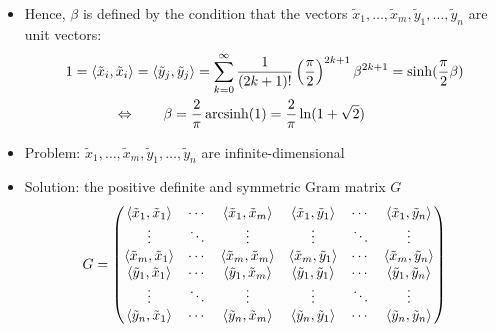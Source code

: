 	\begin{frame}
		\begin{pbmr}
			\begin{itemize}
				\item<1-> Hence, $\beta$ is defined by the condition that the vectors $\tilde{x}_1,\dots,\tilde{x}_m,\tilde{y}_1,\dots,\tilde{y}_n$ are unit vectors:
					\begin{gather*}
						1 = \langle{\tilde{x}_i},{\tilde{x}_i}\rangle = \langle{\tilde{y}_j},{\tilde{y}_j}\rangle
						= \sum_{k=0}^\infty \frac{1}{(2k+1)!}\left(\frac{\pi}{2}\right)^{2k+1}\beta^{2k+1}=\sinh(\frac{\pi}{2}\beta)\\
						\Leftrightarrow \qquad\beta = \frac{2}{\pi} \operatorname{arcsinh}(1) = \frac{2}{\pi}\ln(1+\sqrt{2}) \qquad\quad~
					\end{gather*}
				\item<2-> Problem: $\tilde{x}_1,\dots,\tilde{x}_m,\tilde{y}_1,\dots,\tilde{y}_n$ are infinite-dimensional
				\item<3-> Solution: the positive definite and symmetric Gram matrix $G$
					\begin{equation}
						G=\begin{pmatrix}
							\langle{\tilde{x}_1},{\tilde{x}_1}\rangle & \cdots & \langle{\tilde{x}_1},{\tilde{x}_m}\rangle& \langle{\tilde{x}_1},{\tilde{y}_1}\rangle & \cdots & \langle{\tilde{x}_1},{\tilde{y}_n}\rangle \\
							 \vdots		& \ddots	& \vdots & \vdots & \ddots & \vdots\\
							 \langle{\tilde{x}_m},{\tilde{x}_1}\rangle & \cdots & \langle{\tilde{x}_m},{\tilde{x}_m}\rangle& \langle{\tilde{x}_m},{\tilde{y}_1}\rangle & \cdots & \langle{\tilde{x}_m},{\tilde{y}_n}\rangle \\
							\langle{\tilde{y}_1},{\tilde{x}_1}\rangle & \cdots & \langle{\tilde{y}_1},{\tilde{x}_m}\rangle& \langle{\tilde{y}_1},{\tilde{y}_1}\rangle & \cdots & \langle{\tilde{y}_1},{\tilde{y}_n}\rangle \\
							 \vdots		& \ddots	& \vdots& \vdots & \ddots & \vdots\\
							 \langle{\tilde{y}_n},{\tilde{x}_1}\rangle & \cdots & \langle{\tilde{y}_n},{\tilde{x}_m}\rangle& \langle{\tilde{y}_n},{\tilde{y}_1}\rangle & \cdots & \langle{\tilde{y}_n},{\tilde{y}_n}\rangle 
						\end{pmatrix}
					\end{equation}
			\end{itemize}
		\end{pbmr}
	\end{frame}
	
